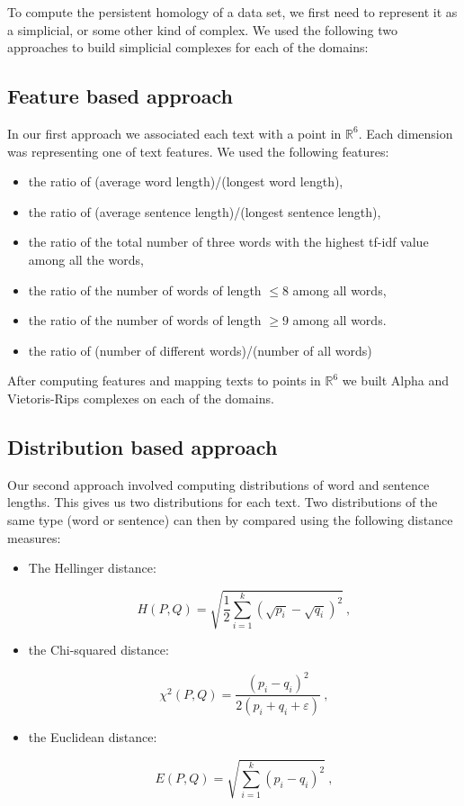 \documentclass[12pt,a4paper]{amsart}
\def\R{\mathbb R}
\begin{document}
To compute the persistent homology of a data set, we first need to represent it
as a simplicial, or some other kind of complex. We used the following two
approaches to build simplicial complexes for each of the domains:

\subsection{Feature based approach}

In our first approach we associated each text with a point in $\R ^6$. Each dimension was representing one of text features. We used the following features:
\begin{itemize}
  \setlength\itemsep{0.5em}
  \item the ratio of (average word length)/(longest word length),
  \item the ratio of (average sentence length)/(longest sentence length),
  \item the ratio of the total number of three words with the highest tf-idf
    value among all the words,
  \item the ratio of the number of words of length $\le 8$ among all words,
  \item the ratio of the number of words of length $\ge 9$ among all words.
  \item the ratio of (number of different words)/(number of all words)
\end{itemize}

After computing features and mapping texts to points in $\R ^6$ we
built Alpha and Vietoris-Rips complexes on each of the domains.

\subsection{Distribution based approach}

Our second approach involved computing distributions of word and sentence
lengths. This gives us two distributions for each text. Two distributions of the same type (word or sentence) can then by compared using the following distance measures:

\begin{itemize}
\item The Hellinger distance:

\begin{equation*}
  H(P,Q) = \sqrt{\frac{1}{2} \sum_{i=1}^k\left(\sqrt{p_i} -
    \sqrt{q_i}\right)^2}\ ,
\end{equation*}

\item the Chi-squared distance:

\begin{equation*}
  \chi^2(P,Q) = \frac{(p_i - q_i)^2}{2(p_i + q_i + \varepsilon)}\ ,
\end{equation*}

\item the Euclidean distance:

\begin{equation*}
  E(P,Q) = \sqrt{\sum_{i=1}^k\left(p_i - q_i\right)^2}\ ,
\end{equation*}
\end{itemize}
\end{document}
